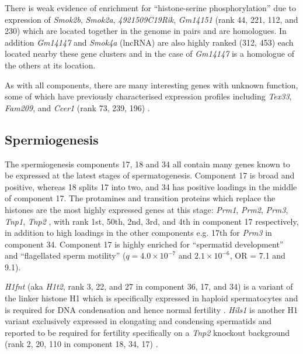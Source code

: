 There is weak evidence of enrichment for ``histone-serine phosphorylation'' due to expression of \textit{Smok2b}, \textit{Smok2a}, \textit{4921509C19Rik}, \textit{Gm14151} (rank 44, 221, 112, and 230) which are located together in the genome in pairs and are homologues.
In addition \textit{Gm14147} and \textit{Smok4a} (lncRNA) are also highly ranked (312, 453) each located nearby these gene clusters and in the case of \textit{Gm14147} is a homologue of the others at its location.

As with all components, there are many interesting genes with unknown function, some of which have previously characterised expression profiles including \textit{Tex33}, \textit{Fam209}, and \textit{Ccer1} (rank 73, 239, 196) \parencite{Kwon2017Expression}.


\subsection{Spermiogenesis}

The spermiogenesis components 17, 18 and 34 all contain many genes known to be expressed at the latest stages of spermatogenesis.
Component 17 is broad and positive, whereas 18 splits 17 into two, and 34 has positive loadings in the middle of component 17.
The protamines and transition proteins which replace the histones are the most highly expressed genes at this stage: \textit{Prm1}, \textit{Prm2}, \textit{Prm3}, \textit{Tnp1}, \textit{Tnp2} \parencite{Sassone-Corsi2002Unique}, with rank 1st, 50th, 2nd, 3rd, and 4th in component 17 respectively, in addition to high loadings in the other components e.g. 17th for \textit{Prm3} in component 34.
Component 17 is highly enriched for ``spermatid development'' and ``flagellated sperm motility'' ($q = 4.0\times10^{-7}$ and $2.1\times10^{-6}$, OR = 7.1 and 9.1).

\textit{H1fnt} (aka \textit{H1t2}, rank 3, 22, and 27 in component 36, 17, and 34) is a variant of the linker histone H1 which is specifically expressed in haploid spermatocytes and is required for DNA condensation and hence normal fertility \parencite{Martianov2005Polar, Tanaka2005HANP1}.
\textit{Hils1} is another H1 variant exclusively expressed in elongating and condensing spermatids and reported to be required for fertility specifically on a \textit{Tnp2} knockout background (rank 2, 20, 110 in component 18, 34, 17) \parencite{Yan2003HILS1, Wu2009Genetic}.

